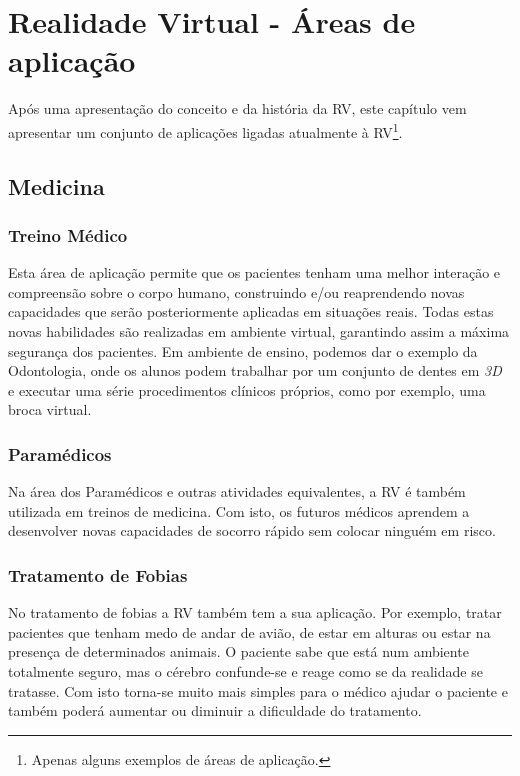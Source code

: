\chapter{Realidade Virtual - Áreas de aplicação}

Após uma apresentação do conceito e da história da \acl{RV}, este capítulo vem apresentar um conjunto de aplicações ligadas atualmente à \acl{RV}\footnote{Apenas alguns exemplos de áreas de aplicação.}.
 
\section{Medicina}

\subsection{Treino Médico}
Esta área de aplicação permite que os pacientes tenham uma melhor interação e compreensão sobre o corpo humano, construindo e/ou reaprendendo novas capacidades que serão posteriormente aplicadas em situações reais. Todas estas novas habilidades são realizadas em ambiente virtual, garantindo assim a máxima segurança dos pacientes.
Em ambiente de ensino, podemos dar o exemplo da Odontologia, onde os alunos podem trabalhar por um conjunto de dentes em \emph{3D} e executar uma série procedimentos clínicos próprios, como por exemplo, uma broca virtual.

\subsection{Paramédicos}
Na área dos Paramédicos e outras atividades equivalentes, a \acl{RV} é também utilizada em treinos de medicina. Com isto, os futuros médicos aprendem a desenvolver novas capacidades de socorro rápido sem colocar ninguém em risco. 

\subsection{Tratamento de Fobias}	
No tratamento de fobias a \acl{RV} também tem a sua aplicação. Por exemplo, tratar pacientes que tenham medo de andar de avião, de estar em alturas ou estar na presença de determinados animais. O paciente sabe que está num ambiente totalmente seguro, mas o cérebro confunde-se e reage como se da realidade se tratasse. Com isto torna-se muito mais simples para o médico ajudar o paciente e também poderá aumentar ou diminuir a dificuldade do tratamento.

